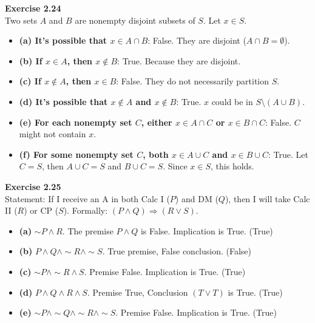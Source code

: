 \documentclass[11pt]{article}
\begin{document}
\vspace{10pt}
\textbf{Exercise 2.24} \\
Two sets $A$ and $B$ are nonempty disjoint subsets of $S$. Let $x \in S$.
\begin{itemize}
    \item \textbf{(a) It's possible that $x \in A \cap B$}: False. They are disjoint ($A \cap B = \emptyset$).
    \item \textbf{(b) If $x \in A$, then $x \notin B$}: True. Because they are disjoint.
    \item \textbf{(c) If $x \notin A$, then $x \in B$}: False. They do not necessarily partition $S$.
    \item \textbf{(d) It's possible that $x \notin A$ and $x \notin B$}: True. $x$ could be in $S \setminus (A \cup B)$.
    \item \textbf{(e) For each nonempty set $C$, either $x \in A \cap C$ or $x \in B \cap C$}: False. $C$ might not contain $x$.
    \item \textbf{(f) For some nonempty set $C$, both $x \in A \cup C$ and $x \in B \cup C$}: True. Let $C = S$, then $A \cup C = S$ and $B \cup C = S$. Since $x \in S$, this holds.
\end{itemize}

\vspace{10pt}
\textbf{Exercise 2.25} \\
Statement: If I receive an A in both Calc I ($P$) and DM ($Q$), then I will take Calc II ($R$) or CP ($S$). Formally: $(P \wedge Q) \Rightarrow (R \vee S)$.
\begin{itemize}
    \item \textbf{(a)} $\sim P \wedge R$. The premise $P \wedge Q$ is False. Implication is True. (True)
    \item \textbf{(b)} $P \wedge Q \wedge \sim R \wedge \sim S$. True premise, False conclusion. (False)
    \item \textbf{(c)} $\sim P \wedge \sim R \wedge S$. Premise False. Implication is True. (True)
    \item \textbf{(d)} $P \wedge Q \wedge R \wedge S$. Premise True, Conclusion $(T \vee T)$ is True. (True)
    \item \textbf{(e)} $\sim P \wedge \sim Q \wedge \sim R \wedge \sim S$. Premise False. Implication is True. (True)
\end{itemize}
\end{document}
